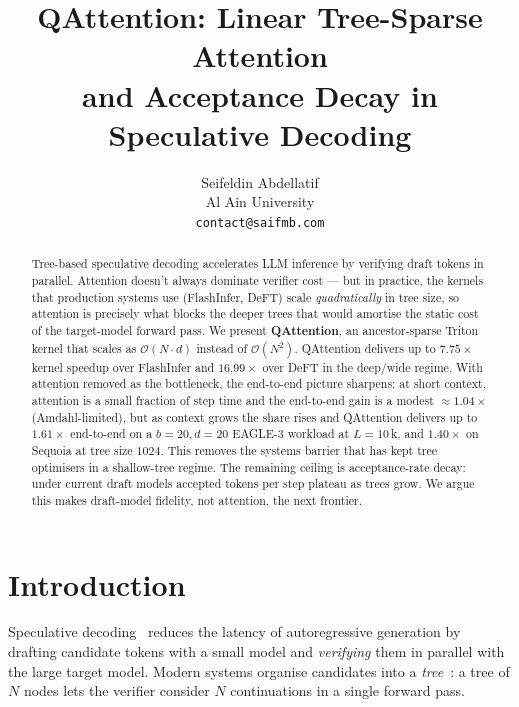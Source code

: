 \documentclass{article}
\title{QAttention: Linear Tree-Sparse Attention\\
       and Acceptance Decay in Speculative Decoding}
\author{
  Seifeldin Abdellatif\\
  Al Ain University\\
  \texttt{contact@saifmb.com}
  }
\newcommand{\method}{QAttention}
\newcommand{\bigO}[1]{\mathcal{O}(#1)}
\newcommand{\numtokens}{N}
\newcommand{\depth}{d}
\newcommand{\branching}{b}
\newcommand{\prefixlen}{L}
\begin{document}
\maketitle

\begin{abstract}
Tree-based speculative decoding accelerates LLM inference by verifying
draft tokens in parallel. Attention doesn't always dominate verifier cost
--- but in practice, the kernels that production systems use
(FlashInfer, DeFT) scale \emph{quadratically} in tree size, so attention
is precisely what blocks the deeper trees that would amortise the static
cost of the target-model forward pass.
We present \textbf{\method{}}, an ancestor-sparse Triton kernel that
scales as $\bigO{\numtokens \!\cdot\! \depth}$ instead of
$\bigO{\numtokens^2}$. \method{} delivers up to
$\boldsymbol{7.75\!\times}$ kernel speedup over FlashInfer and
$\boldsymbol{16.99\!\times}$ over DeFT in the deep/wide regime.
With attention removed as the bottleneck, the end-to-end picture
sharpens: at short context, attention is a small fraction of step time
and the end-to-end gain is a modest $\approx\!1.04\times$ (Amdahl-limited),
but as context grows the share rises and \method{} delivers up to
$\boldsymbol{1.61\!\times}$ end-to-end on a $\branching{=}20,\depth{=}20$
EAGLE-3 workload at $\prefixlen{=}10\,$k, and
$\boldsymbol{1.40\!\times}$ on Sequoia at tree size $1024$. This removes
the systems barrier that has kept tree optimisers in a shallow-tree regime.
The remaining ceiling is acceptance-rate decay: under current draft
models accepted tokens per step plateau as trees grow. We argue this
makes draft-model fidelity, not attention, the next frontier.
\end{abstract}

\section{Introduction}
\label{sec:intro}

Speculative decoding~\cite{leviathan2023fast,chen2023accelerating}
reduces the latency of autoregressive generation by drafting candidate
tokens with a small model and \emph{verifying} them in parallel with the
large target model. Modern systems organise candidates into a
\emph{tree}~\cite{cai2024medusa,li2024eagle,li2024eagle2,li2025eagle3,
chen2024sequoia,miao2024specinfer}: a tree of $\numtokens$ nodes lets the
verifier consider $\numtokens$ continuations in a single forward pass.
\end{document}
